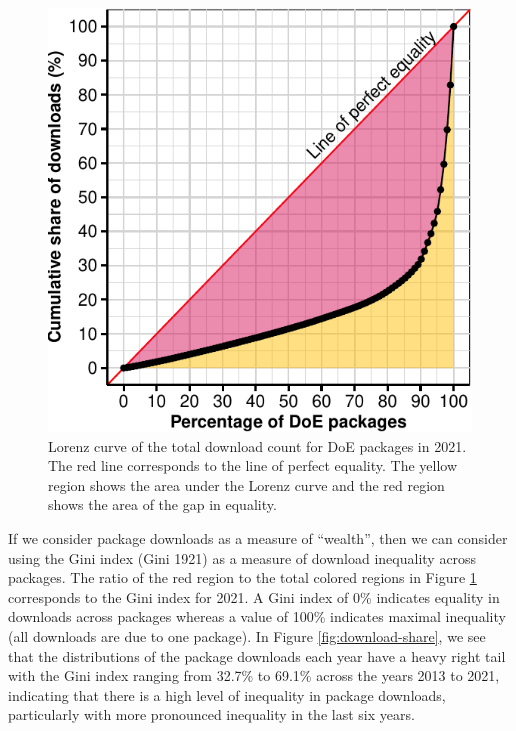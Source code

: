 \documentclass{article}
\begin{document}
\begin{figure}[htbp]

{\centering \includegraphics{figures/plot-lorenz-1} 

}

\caption{Lorenz curve of the total download count for DoE packages in 2021. The red line corresponds to the line of perfect equality. The yellow region shows the area under the Lorenz curve and the red region shows the area of the gap in equality.}\label{fig:plot-lorenz}
\end{figure}

If we consider package downloads as a measure of ``wealth'', then we can
consider using the Gini index (Gini 1921) as a measure of download
inequality across packages. The ratio of the red region to the total
colored regions in Figure \ref{fig:plot-lorenz} corresponds to the Gini
index for 2021. A Gini index of 0\% indicates equality in downloads
across packages whereas a value of 100\% indicates maximal inequality
(all downloads are due to one package). In Figure
\ref{fig:download-share}, we see that the distributions of the package
downloads each year have a heavy right tail with the Gini index ranging
from 32.7\% to 69.1\% across the years 2013 to 2021, indicating that
there is a high level of inequality in package downloads, particularly
with more pronounced inequality in the last six years.
\end{document}
